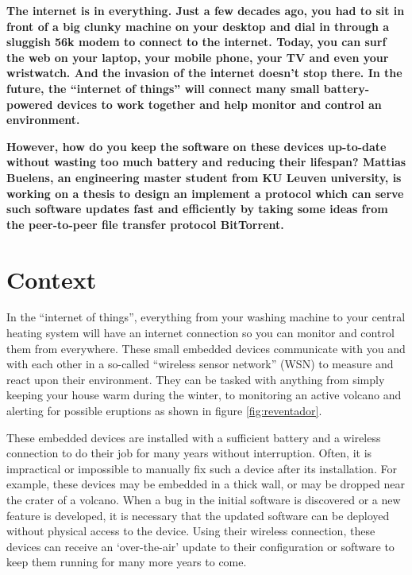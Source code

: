 \documentclass[ DIV=calc,%
                paper=a4,%
                fontsize=12pt,%
                twocolumn%
              ]{scrartcl}	 			%
\title{\Title}
\author{\Author, }
\date{}
\newcommand{\Author}{Mattias Buelens}
\newcommand{\Institute}{KU Leuven}
\begin{document}
\maketitle
\thispagestyle{fancy} 			%
\textbf{The internet is in everything. Just a few decades ago, you had to sit in front of a big clunky machine on your desktop and dial in through a sluggish 56k modem to connect to the internet. Today, you can surf the web on your laptop, your mobile phone, your TV and even your wristwatch. And the invasion of the internet doesn't stop there. In the future, the ``internet of things'' will connect many small battery-powered devices to work together and help monitor and control an environment.}

\textbf{However, how do you keep the software on these devices up-to-date without wasting too much battery and reducing their lifespan? \Author, an engineering master student from \Institute{} university, is working on a thesis to design an implement a protocol which can serve such software updates fast and efficiently by taking some ideas from the peer-to-peer file transfer protocol BitTorrent.}

\vfill\eject

\section*{Context}
In the ``internet of things'', everything from your washing machine to your central heating system will have an internet connection so you can monitor and control them from everywhere. These small embedded devices communicate with you and with each other in a so-called ``wireless sensor network'' (WSN) to measure and react upon their environment. They can be tasked with anything from simply keeping your house warm during the winter, to monitoring an active volcano and alerting for possible eruptions as shown in figure \ref{fig:reventador}.

These embedded devices are installed with a sufficient battery and a wireless connection to do their job for many years without interruption. Often, it is impractical or impossible to manually fix such a device after its installation. For example, these devices may be embedded in a thick wall, or may be dropped near the crater of a volcano. When a bug in the initial software is discovered or a new feature is developed, it is necessary that the updated software can be deployed without physical access to the device. Using their wireless connection, these devices can receive an `over-the-air' update to their configuration or software to keep them running for many more years to come.
\end{document}
